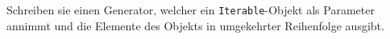 Schreiben sie einen Generator, welcher ein \lstinline$Iterable$-Objekt als Parameter annimmt und die Elemente des Objekts in umgekehrter Reihenfolge ausgibt.